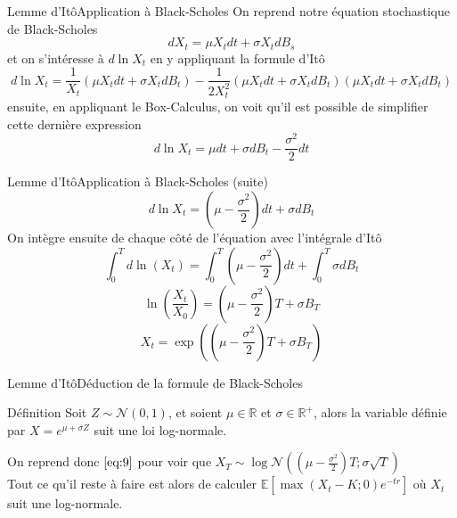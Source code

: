 \documentclass{beamer}
\newcommand{\1}{\mathmybb{1}}
\begin{document}
   \begin{frame}{Lemme d'Itô}{Application à Black-Scholes}
     On reprend notre équation stochastique de Black-Scholes
     \begin{equation}
       dX_{t} = \mu X_{t} dt + \sigma X_{t} dB_{s}
     \end{equation}
     \pause
     et on s'intéresse à $d \ln X_{t}$ en y appliquant la formule d'Itô
     \[
       d \ln X_{t} = \frac{1}{X_{t}} \left( \mu X_{t} dt + \sigma X_{t} dB_{t} \right) - \frac{1}{2X_{t}^{2}} \left( \mu X_{t} dt + \sigma X_{t} dB_{t} \right) \left( \mu X_{t}dt + \sigma X_{t} dB_{t}\right)
     \]
     \pause
     ensuite, en appliquant le Box-Calculus, on voit qu'il est possible de simplifier cette dernière expression
     \begin{equation}
       d \ln X_{t} =  \mu dt + \sigma dB_{t} - \frac{\sigma^{2}}{2} dt
     \end{equation}
   \end{frame}
   \begin{frame}{Lemme d'Itô}{Application à Black-Scholes (suite)}
     \[
       d \ln X_{t} = \left( \mu - \frac{\sigma^{2}}{2} \right) dt + \sigma dB_{t}
     \]
     \pause
     On intègre ensuite de chaque côté de l'équation avec l'intégrale d'Itô
     \[
       \int_{0}^{T} d \ln \left(  X_{t} \right) = \int_{0}^{T} \left(\mu - \frac{\sigma^{2}}{2} \right) dt + \int_{0}^{T} \sigma dB_{t}
     \]
     \pause
     \[
       \ln \left(\frac{X_{t}}{X_{0}} \right) = \left( \mu - \frac{\sigma^{2}}{2} \right) T + \sigma B_{T}
     \]
     \pause
     \begin{equation} \label{eq:9}
       X_{t} = \exp \left(  \left( \mu - \frac{\sigma^{2}}{2} \right) T + \sigma B_{T} \right)
     \end{equation}
   \end{frame}
   \begin{frame}{Lemme d'Itô}{Déduction de la formule de Black-Scholes}
     \begin{block}{Définition}
       Soit $Z \sim \mathcal{N}\left(0, 1 \right)$, et soient $\mu \in \mathbb{R}$ et $\sigma \in \mathbb{R}^{+}$, alors la variable définie par $ X = e^{\mu + \sigma Z}$ suit une loi log-normale.
     \end{block}
     On reprend donc $ \ref{eq:9} $ pour voir que $X_{T} \sim \log \mathcal{N} \left( \left( \mu - \frac{\sigma^{2}}{2} \right) T; \sigma \sqrt{T}  \right)$ \\
     \pause
     Tout ce qu'il reste à faire est alors de calculer $\mathbb{E}\left[\max(X_{t} - K; 0)e^{-tr}\right]$ où $ X_{t}$ suit une log-normale.
   \end{frame}
\end{document}
